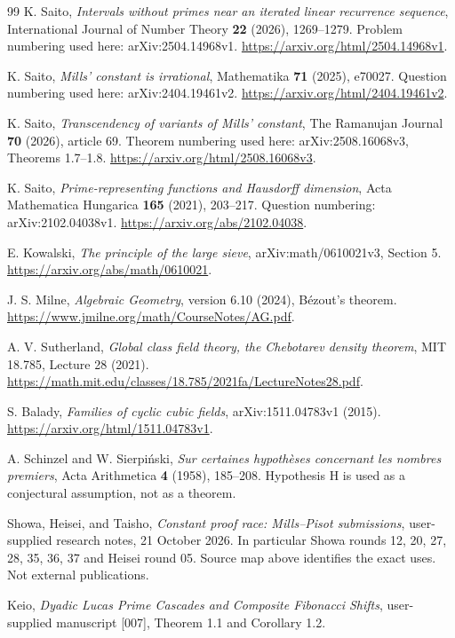 \documentclass[11pt,a4paper]{article}
\theoremstyle{definition}\newtheorem{definition}[theorem]{Definition}
\theoremstyle{remark}\newtheorem{remark}[theorem]{Remark}
\begin{document}
\begin{thebibliography}{99}
 K. Saito,
\emph{Intervals without primes near an iterated linear recurrence sequence},
International Journal of Number Theory \textbf{22} (2026), 1269--1279.
Problem numbering used here: arXiv:2504.14968v1.
\url{https://arxiv.org/html/2504.14968v1}.

 K. Saito, \emph{Mills' constant is irrational},
Mathematika \textbf{71} (2025), e70027.
Question numbering used here: arXiv:2404.19461v2.
\url{https://arxiv.org/html/2404.19461v2}.

 K. Saito,
\emph{Transcendency of variants of Mills' constant},
The Ramanujan Journal \textbf{70} (2026), article 69.
Theorem numbering used here: arXiv:2508.16068v3, Theorems 1.7--1.8.
\url{https://arxiv.org/html/2508.16068v3}.

 K. Saito,
\emph{Prime-representing functions and Hausdorff dimension},
Acta Mathematica Hungarica \textbf{165} (2021), 203--217.
Question numbering: arXiv:2102.04038v1.
\url{https://arxiv.org/abs/2102.04038}.

 E. Kowalski,
\emph{The principle of the large sieve}, arXiv:math/0610021v3,
Section 5. \url{https://arxiv.org/abs/math/0610021}.

 J. S. Milne, \emph{Algebraic Geometry},
version 6.10 (2024), B\'ezout's theorem.
\url{https://www.jmilne.org/math/CourseNotes/AG.pdf}.

 A. V. Sutherland,
\emph{Global class field theory, the Chebotarev density theorem},
MIT 18.785, Lecture 28 (2021).
\url{https://math.mit.edu/classes/18.785/2021fa/LectureNotes28.pdf}.

 S. Balady, \emph{Families of cyclic cubic fields},
arXiv:1511.04783v1 (2015).
\url{https://arxiv.org/html/1511.04783v1}.

 A. Schinzel and W. Sierpi\'nski,
\emph{Sur certaines hypoth\`eses concernant les nombres premiers},
Acta Arithmetica \textbf{4} (1958), 185--208.
Hypothesis H is used as a conjectural assumption, not as a theorem.

 Showa, Heisei, and Taisho,
\emph{Constant proof race: Mills--Pisot submissions},
user-supplied research notes, 21 October 2026. In particular Showa
rounds 12, 20, 27, 28, 35, 36, 37 and Heisei round 05.
Source map above identifies the exact uses. Not external publications.

 Keio,
\emph{Dyadic Lucas Prime Cascades and Composite Fibonacci Shifts},
user-supplied manuscript [007], Theorem 1.1 and Corollary 1.2.


\end{thebibliography}
\end{document}
